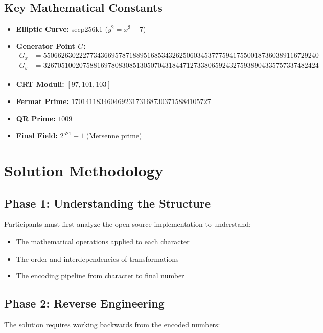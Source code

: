 \documentclass[11pt,a4paper]{article}
\begin{document}
\subsection{Key Mathematical Constants}

\begin{itemize}
    \item \textbf{Elliptic Curve:} secp256k1 ($y^2 = x^3 + 7$)
    \item \textbf{Generator Point $G$:}
    \begin{align}
    G_x &= 55066263022277343669578718895168534326250603453777594175500187360389116729240 \\
    G_y &= 32670510020758816978083085130507043184471273380659243275938904335757337482424
    \end{align}
    \item \textbf{CRT Moduli:} $[97, 101, 103]$
    \item \textbf{Fermat Prime:} $170141183460469231731687303715884105727$
    \item \textbf{QR Prime:} $1009$
    \item \textbf{Final Field:} $2^{521} - 1$ (Mersenne prime)
\end{itemize}

\section{Solution Methodology}

\subsection{Phase 1: Understanding the Structure}

Participants must first analyze the open-source implementation to understand:

\begin{itemize}
    \item The mathematical operations applied to each character
    \item The order and interdependencies of transformations
    \item The encoding pipeline from character to final number
\end{itemize}

\subsection{Phase 2: Reverse Engineering}

The solution requires working backwards from the encoded numbers:
\end{document}
